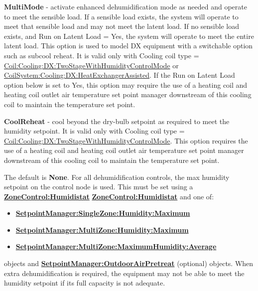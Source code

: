 \textbf{MultiMode} - activate enhanced dehumidification mode as needed and operate to meet the sensible load. If a sensible load exists, the system will operate to meet that sensible load and may not meet the latent load. If no sensible load exists, and Run on Latent Load = Yes, the system will operate to meet the entire latent load. This option is used to model DX equipment with a switchable option such as subcool reheat. It is valid only with Cooling coil type = \hyperref[coilcoolingdxtwostagewithhumiditycontrolmode]{Coil:Cooling:DX:TwoStageWithHumidityControlMode} or \hyperref[coilsystemcoolingdxheatexchangerassisted]{CoilSystem:Cooling:DX:HeatExchangerAssisted}. If the Run on Latent Load option below is set to Yes, this option may require the use of a heating coil and heating coil outlet air temperature set point manager downstream of this cooling coil to maintain the temperature set point.

\textbf{CoolReheat} - cool beyond the dry-bulb setpoint as required to meet the humidity setpoint. It is valid only with Cooling coil type = \hyperref[coilcoolingdxtwostagewithhumiditycontrolmode]{Coil:Cooling:DX:TwoStageWithHumidityControlMode}. This option requires the use of a heating coil and heating coil outlet air temperature set point manager downstream of this cooling coil to maintain the temperature set point.

The default is \textbf{None}. For all dehumidification controls, the max humidity setpoint on the control node is used. This must be set using a \textbf{\hyperref[zonecontrolhumidistat]{ZoneControl:Humidistat}} \textbf{\hyperref[zonecontrolhumidistat]{ZoneControl:Humidistat}} and one of:

\begin{itemize}
\item
  \textbf{\hyperref[setpointmanagersinglezonehumiditymaximum]{SetpointManager:SingleZone:Humidity:Maximum}}
\item
  \textbf{\hyperref[setpointmanagermultizonehumiditymaximum]{SetpointManager:MultiZone:Humidity:Maximum}}
\item
  \textbf{\hyperref[setpointmanagermultizonemaximumhumidityaverage]{SetpointManager:MultiZone:MaximumHumidity:Average}}
\end{itemize}

objects and \textbf{\hyperref[setpointmanageroutdoorairpretreat]{SetpointManager:OutdoorAirPretreat}} (optional) objects. When extra dehumidification is required, the equipment may not be able to meet the humidity setpoint if its full capacity is not adequate.

